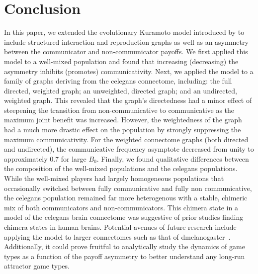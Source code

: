 \documentclass[pdflatex,lineno,referee,sn-mathphys-ay]{sn-jnl}
\begin{document}
\section{Conclusion}
In this paper, we extended the evolutionary Kuramoto model
introduced by \citet{tripp2022evolutionary}
to include structured interaction and reproduction graphs
as well as an asymmetry between
the communicator and non-communicator payoffs.
We first applied this model to a well-mixed population
and found that increasing (decreasing) the asymmetry
inhibits (promotes) communicativity.
Next, we applied the model to
a family of graphs deriving from the \gls{celegans} connectome,
including: the full directed, weighted graph;
an unweighted, directed graph;
and an undirected, weighted graph.
This revealed that the graph's directedness
had a minor effect of steepening the transition
from non-communicative to communicative
as the maximum joint benefit was increased.
However, the weightedness of the graph had a much more drastic effect
on the population by strongly suppressing the maximum communicativity.
For the weighted connectome graphs (both directed and undirected),
the communicative frequency asymptote decreased from unity
to approximately \num{0.7} for large $B_0$.
Finally, we found qualitative differences between the composition
of the well-mixed populations and the \gls{celegans} populations.
While the well-mixed players had largely homogeneous populations
that occasionally switched between fully communicative
and fully non communicative,
the \gls{celegans} population remained far more heterogenous
with a stable, chimeric mix of both communicators and non-communicators.
This chimera state in a model of the \gls{celegans} brain connectome
was suggestive of prior studies finding chimera states in human brains.
Potential avenues of future research include applying the model
to larger connectomes such as that
of \gls{dmelanogaster}~\citep{schlegel2024whole}.
Additionally, it could prove fruitful to analytically study
the dynamics of game types as a function of the payoff asymmetry
to better understand any long-run attractor game types.


\backmatter



\appendix

\end{document}
